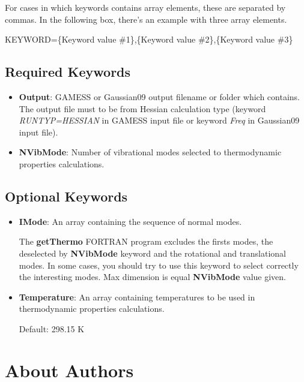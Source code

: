 \documentclass[11pt,oneside,a4paper]{article}
\begin{document}
For cases in which keywords contains array elements, these are separated by commas. In the following box, there's an example with three array elements.
\begin{shaded}
KEYWORD=\{Keyword value \#1\},\{Keyword value \#2\},\{Keyword value \#3\}
\end{shaded}

\subsection{Required Keywords}
\begin{itemize}
\item \textbf{Output}: GAMESS or Gaussian09 output filename or folder which contains. The output file must to be from Hessian calculation type (keyword \textit{RUNTYP=HESSIAN} in GAMESS input file or keyword \textit{Freq} in Gaussian09 input file).
\item \textbf{NVibMode}: Number of vibrational modes selected to thermodynamic properties calculations.
\end{itemize}

\subsection{Optional Keywords}
\begin{itemize}
\item \textbf{IMode}: An array containing the sequence of normal modes.

The \textbf{getThermo} FORTRAN program excludes	the firsts modes, the deselected by \textbf{NVibMode} keyword and the rotational and translational modes. In some cases, you should try to use this keyword to select correctly the interesting modes. Max dimension is equal \textbf{NVibMode} value given.

\item \textbf{Temperature}: An array containing temperatures to be used in thermodynamic properties calculations.

Default: 298.15 K
\end{itemize}

\pagebreak
\section[About Authors]{About Authors}
\end{document}
